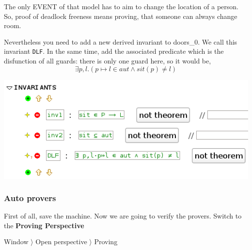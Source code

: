 The only \textsf{EVENT} of that model has to aim to change the location of a person.
So, proof of deadlock freeness means proving, that someone can always change room.

Nevertheless you need to add a new derived invariant to doors\_0. We call this invariant \texttt{DLF}.
In the same time, add the associated predicate which is the disfunction of all guards: there is only one guard here, so it would be,
\[
\exists p,l.(p \longmapsto l \in aut \land sit(p) \neq l )
\]



\begin{center}
	\includegraphics[]{img/tutorial/tut_10_new-invariant.png}
\end{center}

\subsubsection{Auto provers}

First of all, save the machine. Now we are going to verify the provers. 
Switch to the \textbf{Proving Perspective}

\textsf{ Window $\rangle$ Open perspective $\rangle$ Proving }

